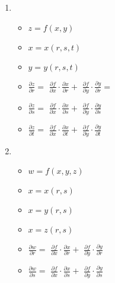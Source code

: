 \documentclass[../practica_04.tex]{subfiles}
\begin{document}
    \begin{enumerate}
        \item
            \begin{itemize}
                \item $z = f(x,y)$
                \item $x = x(r,s,t)$
                \item $y = y(r,s,t)$
                \item $\frac{\partial z}{\partial r} = $
                    $\frac{\partial f}{\partial x} \cdot \frac{\partial x}{\partial r} + $
                    $\frac{\partial f}{\partial y} \cdot \frac{\partial y}{\partial r} = $

                \item $\frac{\partial z}{\partial s} = $
                    $\frac{\partial f}{\partial x} \cdot \frac{\partial x}{\partial s} + $
                    $\frac{\partial f}{\partial y} \cdot \frac{\partial y}{\partial s}$

                \item $\frac{\partial z}{\partial t} = $
                    $\frac{\partial f}{\partial x} \cdot \frac{\partial x}{\partial t} + $
                    $\frac{\partial f}{\partial y} \cdot \frac{\partial y}{\partial t}$
            \end{itemize}
        \item
            \begin{itemize}
                \item $w = f(x,y,z)$
                \item $x = x(r,s)$
                \item $x = y(r,s)$
                \item $x = z(r,s)$
                \item $\frac{\partial w}{\partial r} = $
                    $\frac{\partial f}{\partial x} \cdot \frac{\partial x}{\partial r} + $
                    $\frac{\partial f}{\partial y} \cdot \frac{\partial y}{\partial r}$

                \item $\frac{\partial w}{\partial s} = $
                    $\frac{\partial f}{\partial x} \cdot \frac{\partial x}{\partial s} + $
                    $\frac{\partial f}{\partial y} \cdot \frac{\partial y}{\partial s}$
            \end{itemize}
    \end{enumerate}
\end{document}
